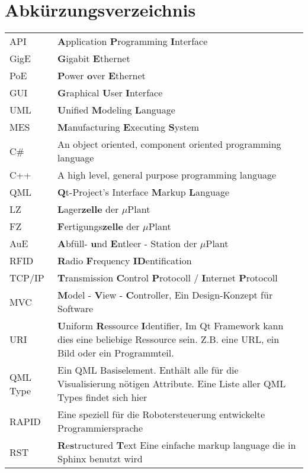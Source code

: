 \chapter*{Abkürzungsverzeichnis}

\begin{center}
	
	\renewcommand{\arraystretch}{1.1}
	
	\begin{supertabular}{p{2.1cm}p{10.9cm}}
		API				& \textbf{A}pplication \textbf{P}rogramming \textbf{I}nterface \\
		GigE			& \textbf{G}igabit \textbf{E}thernet \\
		PoE				& \textbf{P}ower \textbf{o}ver \textbf{E}thernet \\
		GUI				& \textbf{G}raphical \textbf{U}ser \textbf{I}nterface \\
		UML				& \textbf{U}nified \textbf{M}odeling \textbf{L}anguage \\
		MES				& \textbf{M}anufacturing \textbf{E}xecuting \textbf{S}ystem\\
		C\#				& An object oriented, component oriented programming language\\
		C++				& A high level, general purpose programming language\\
		QML				& \textbf{Q}t-Project's Interface \textbf{M}arkup \textbf{L}anguage\\
		LZ				& \textbf{L}ager\textbf{zelle} der $\mu$Plant\\
		FZ				& \textbf{F}ertigungs\textbf{zelle} der $\mu$Plant \\
		AuE				& \textbf{A}bfüll- \textbf{u}nd \textbf{E}ntleer - Station der $\mu$Plant \\
		RFID			& \textbf{R}adio \textbf{F}requency \textbf{ID}entification\\
		TCP/IP			& \textbf{T}ransmission \textbf{C}ontrol \textbf{P}rotocoll / \textbf{I}nternet \textbf{P}rotocoll\\
		MVC				& \textbf{M}odel - \textbf{V}iew - \textbf{C}ontroller, Ein Design-Konzept für Software\\
		URI				& \textbf{U}niform \textbf{R}essource \textbf{I}dentifier, Im Qt Framework kann dies eine beliebige
						  Ressource sein. Z.B. eine URL, ein Bild oder ein Programmteil. \\
		QML Type		& Ein QML Basiselement. Enthält alle für die Visualisierung nötigen Attribute. Eine Liste
						  aller QML Types findet sich hier \cite{qmlTypeList}\\
		RAPID			& Eine speziell für die Robotersteuerung entwickelte Programmiersprache\\
		RST				& \textbf{R}e\textbf{s}tructured \textbf{T}ext Eine einfache markup language die in Sphinx benutzt wird\\
	\end{supertabular}

\end{center}